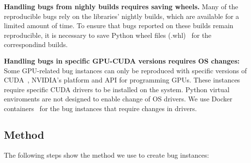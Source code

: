 \documentclass[sigconf,screen]{acmart}
\begin{document}
\textbf{Handling bugs from nighly builds requires saving wheels.}
Many of the reproducible bugs rely on the libraries' nightly builds,
which are available for a limited amount of time. To ensure that bugs
reported on these builds remain reproducible, it is necessary to save
Python wheel files (.whl)~\cite{wheels} for the correspondind builds.

\textbf{Handling bugs in specific GPU-CUDA versions requires OS
  changes:} Some GPU-related bug instances can only be reproduced with
specific versions of CUDA~\cite{cuda}, NVIDIA's platform and API for
programming GPUs. These instances require specific CUDA drivers to be
installed on the system. Python virtual enviroments are not designed
to enable change of OS drivers.
We use Docker containers~\cite{merkel2014docker} for the bug instances
that require changes in drivers.

\subsection{Method}
\label{sec:method}

The following steps show the method we use to create bug instances:
\end{document}
